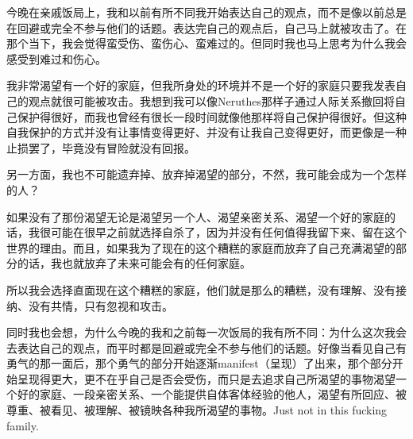 今晚在亲戚饭局上，我和以前有所不同\pozhehao{}我开始表达自己的观点，而不是像以前总是在回避或完全不参与他们的话题。表达完自己的观点后，自己马上就被攻击了。在那个当下，我会觉得蛮受伤、蛮伤心、蛮难过的。但同时我也马上思考为什么我会感受到难过和伤心。

我非常渴望有一个好的家庭，但我所身处的环境并不是一个好的家庭\pozhehao{}只要我发表自己的观点就很可能被攻击。我想到我可以像Neruthes那样子通过人际关系撤回将自己保护得很好，而我也曾经有很长一段时间就像他那样将自己保护得很好。但这种自我保护的方式并没有让事情变得更好、并没有让我自己变得更好，而更像是一种止损罢了，毕竟没有冒险就没有回报。

另一方面，我也不可能遗弃掉、放弃掉渴望的部分，不然，我可能会成为一个怎样的人？

如果没有了那份渴望\pozhehao{}无论是渴望另一个人、渴望亲密关系、渴望一个好的家庭\pozhehao{}的话，我很可能在很早之前就选择自杀了，因为并没有任何值得我留下来、留在这个世界的理由。而且，如果我为了现在的这个糟糕的家庭而放弃了自己充满渴望的部分的话，我也就放弃了未来可能会有的任何家庭。

所以我会选择直面现在这个糟糕的家庭，他们就是那么的糟糕，没有理解、没有接纳、没有共情，只有忽视和攻击。

同时我也会想，为什么今晚的我和之前每一次饭局的我有所不同：为什么这次我会去表达自己的观点，而平时都是回避或完全不参与他们的话题。好像当看见自己有勇气的那一面后，那个勇气的部分开始逐渐manifest（呈现）了出来，那个部分开始呈现得更大，更不在乎自己是否会受伤，而只是去追求自己所渴望的事物\pozhehao{}渴望一个好的家庭、一段亲密关系、一个能提供自体客体经验的他人，渴望有所回应、被尊重、被看见、被理解、被镜映\pozhehao{}各种我所渴望的事物。Just not in this fucking family.


